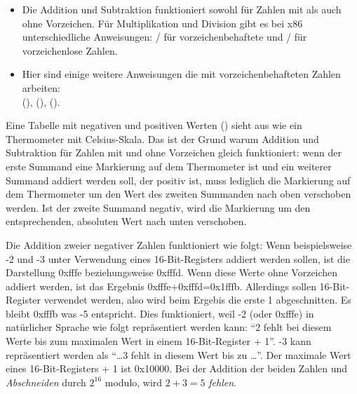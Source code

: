 \begin{itemize}
\item 
	Die Addition und Subtraktion funktioniert sowohl für Zahlen mit als auch ohne Vorzeichen.
	Für Multiplikation und Division gibt es bei x86 unterschiedliche Anweisungen:
	/ für vorzeichenbehaftete und / für vorzeichenlose Zahlen.
\item
	Hier sind einige weitere Anweisungen die mit vorzeichenbehafteten Zahlen arbeiten:\\
	 (),  (),  ().
\end{itemize}

Eine Tabelle mit negativen und positiven Werten () sieht aus wie ein Thermometer mit Celsius-Skala.
Das ist der Grund warum Addition und Subtraktion für Zahlen mit und ohne Vorzeichen gleich funktioniert:
wenn der erste Summand eine Markierung auf dem Thermometer ist und ein weiterer Summand addiert werden soll,
der positiv ist, muss lediglich die Markierung auf dem Thermometer um den Wert des zweiten Summanden nach
oben verschoben werden.
Ist der zweite Summand negativ, wird die Markierung um den entsprechenden, absoluten Wert nach unten verschoben.

Die Addition zweier negativer Zahlen funktioniert wie folgt:
Wenn beispielsweise -2 und -3 unter Verwendung eines 16-Bit-Registers addiert werden sollen,
ist die Darstellung 0xfffe beziehungsweise 0xfffd.
Wenn diese Werte ohne Vorzeichen addiert werden, ist das Ergebnis 0xfffe+0xfffd=0x1fffb.
Allerdings sollen 16-Bit-Register verwendet werden, also wird beim Ergebis die erste 1 abgeschnitten.
Es bleibt 0xfffb was -5 entspricht.
Dies funktioniert, weil -2 (oder 0xfffe) in natürlicher Sprache wie folgt repräsentiert werden kann:
``2 fehlt bei diesem Werte bis zum maximalen Wert in einem 16-Bit-Register + 1''.
-3 kann repräsentiert werden als ``\dots 3 fehlt in diesem Wert bis zu \dots''.
Der maximale Wert eines 16-Bit-Registers + 1 ist 0x10000.
Bei der Addition der beiden Zahlen und \emph{Abschneiden}  durch $2^{16}$ modulo,
wird $2+3=5$ \emph{fehlen}.







